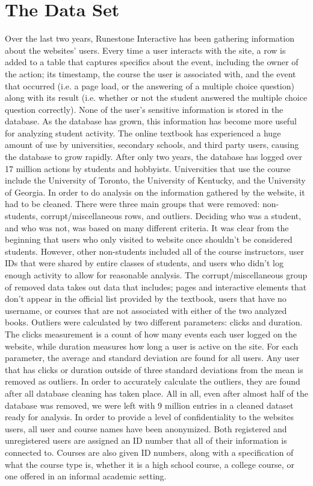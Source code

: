 \section*{The Data Set}

Over the last two years, Runestone Interactive has been gathering information about the websites’ users. Every time a user interacts with the site, a row is added to a table that captures specifics about the event, including the owner of the action; its timestamp, the course the user is associated with, and the event that occurred (i.e. a page load, or the answering of a multiple choice question) along with its result (i.e. whether or not the student answered the multiple choice question correctly). None of the user’s sensitive information is stored in the database. As the database has grown, this information has become more useful for analyzing student activity.   
The online textbook has experienced a huge amount of use by universities, secondary schools, and third party users, causing the database to grow rapidly. After only two years, the database has logged over 17 million actions by students and hobbyists. Universities that use the course include the University of Toronto, the University of Kentucky, and the University of Georgia.
In order to do analysis on the information gathered by the website, it had to be cleaned. There were three main groups that were removed: non-students, corrupt/miscellaneous rows, and outliers. Deciding who was a student, and who was not, was based on many different criteria. It was clear from the beginning that users who only visited to website once shouldn’t be considered students. However, other non-students included all of the course instructors, user IDs that were shared by entire classes of students, and users who didn’t log enough activity to allow for reasonable analysis. 
The corrupt/miscellaneous group of removed data takes out data that includes; pages and interactive elements that don’t appear in the official list provided by the textbook, users that have no username, or courses that are not associated with either of the two analyzed books.  
Outliers were calculated by two different parameters: clicks and duration. The clicks measurement is a count of how many events each user logged on the website, while duration measures how long a user is active on the site. For each parameter, the average and standard deviation are found for all users. Any user that has clicks or duration outside of three standard deviations from the mean is removed as outliers. In order to accurately calculate the outliers, they are found after all database cleaning has taken place. All in all, even after almost half of the database was removed, we were left with 9 million entries in a cleaned dataset ready for analysis. 
In order to provide a level of confidentiality to the websites users, all user and course names have been anonymized. Both registered and unregistered users are assigned an ID number that all of their information is connected to. Courses are also given ID numbers, along with a specification of what the course type is, whether it is a high school course, a college course, or one offered in an informal academic setting.  

